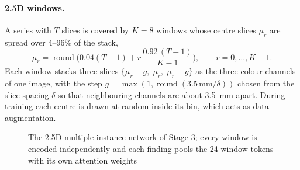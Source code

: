 \paragraph{2.5D windows.} A series with $T$ slices is covered by $K=8$ windows whose centre slices $\mu_r$ are spread over 4--96\% of the stack,
\begin{equation}
\mu_r = \operatorname{round}\!\Big(0.04(T-1) + r\,\frac{0.92\,(T-1)}{K-1}\Big), \qquad r = 0,\dots,K-1 .
\label{eq:centres}
\end{equation}
Each window stacks three slices $\{\mu_r-g,\;\mu_r,\;\mu_r+g\}$ as the three colour channels of one image, with the step $g=\max(1,\operatorname{round}(3.5\,\text{mm}/\delta))$ chosen from the slice spacing $\delta$ so that neighbouring channels are about 3.5~mm apart. During training each centre is drawn at random inside its bin, which acts as data augmentation.

\begin{figure}[htbp]
\centering{}
\caption[The 2.5D multiple-instance network]{The 2.5D multiple-instance network of Stage 3; every window is encoded independently and each finding pools the 24 window tokens with its own attention weights}
\label{fig:mil}
\end{figure}

